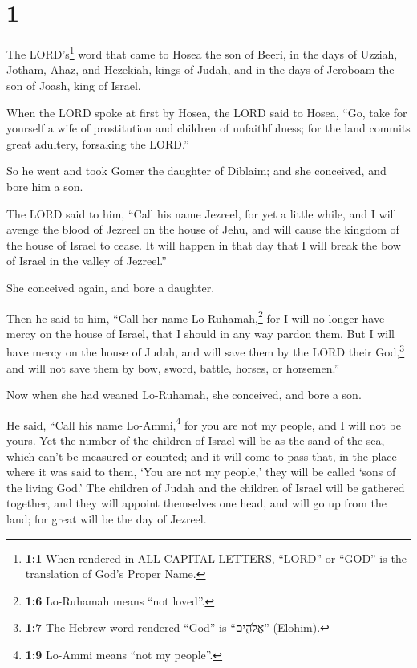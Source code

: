 \hypertarget{section}{%
\section{1}\label{section}}

 The LORD's\footnote{\textbf{1:1} When rendered in ALL
  CAPITAL LETTERS, ``LORD'' or ``GOD'' is the translation of God's
  Proper Name.} word that came to Hosea the son of Beeri, in the days of
Uzziah, Jotham, Ahaz, and Hezekiah, kings of Judah, and in the days of
Jeroboam the son of Joash, king of Israel.

 When the LORD spoke at first by Hosea, the LORD said to
Hosea, ``Go, take for yourself a wife of prostitution and children of
unfaithfulness; for the land commits great adultery, forsaking the
LORD.''

 So he went and took Gomer the daughter of Diblaim; and
she conceived, and bore him a son.

 The LORD said to him, ``Call his name Jezreel, for yet a
little while, and I will avenge the blood of Jezreel on the house of
Jehu, and will cause the kingdom of the house of Israel to cease.
 It will happen in that day that I will break the bow of
Israel in the valley of Jezreel.''

 She conceived again, and bore a daughter.

Then he said to him, ``Call her name Lo-Ruhamah,\footnote{\textbf{1:6}
  Lo-Ruhamah means ``not loved''.} for I will no longer have mercy on
the house of Israel, that I should in any way pardon them.
 But I will have mercy on the house of Judah, and will
save them by the LORD their God,\footnote{\textbf{1:7} The Hebrew word
  rendered ``God'' is ``אֱלֹהִ֑ים'' (Elohim).} and will not save them by
bow, sword, battle, horses, or horsemen.''

 Now when she had weaned Lo-Ruhamah, she conceived, and
bore a son.

 He said, ``Call his name Lo-Ammi,\footnote{\textbf{1:9}
  Lo-Ammi means ``not my people''.} for you are not my people, and I
will not be yours.  Yet the number of the children of
Israel will be as the sand of the sea, which can't be measured or
counted; and it will come to pass that, in the place where it was said
to them, `You are not my people,' they will be called `sons of the
living God.'  The children of Judah and the children of
Israel will be gathered together, and they will appoint themselves one
head, and will go up from the land; for great will be the day of
Jezreel.

